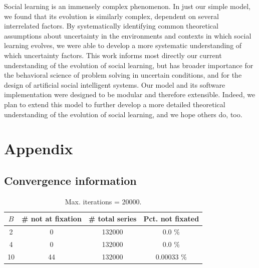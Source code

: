 \documentclass[letterpaper,11.5pt]{scrartcl}
\begin{document}
Social learning is an immensely complex phenomenon. In just our simple model, we
found that its evolution is similarly complex, dependent on several interrelated
factors. By systematically identifying common theoretical assumptions about
uncertainty in the environments and contexts in which social learning evolves,
we were able to develop a more systematic understanding of which uncertainty
factors. This work informs most directly our current understanding of the
evolution of social learning, but
has broader importance for the behavioral science of problem solving in uncertain
conditions, and for the design of artificial social intelligent systems.
Our model and its software implementation were designed to be modular and 
therefore extensible.  Indeed, we plan to extend this model to further develop 
a more detailed theoretical understanding of the evolution of social learning, 
and we hope others do, too.



% 


\appendix


\section{Appendix}

\subsection{Convergence information}

\begin{table}[h]
  \caption{Max. iterations = 20000.}
  \label{tab:convergence}
  \centering
  \begin{tabular}{cccc} \toprule
    $B$ & \# not at fixation & \# total series & Pct. not fixated \\
    \midrule  
    2  & 0  & 132000 & 0.0 \% \\
    4  & 0  & 132000 & 0.0 \% \\
    10 & 44 & 132000 & 0.00033  \% \\
    \bottomrule
  \end{tabular} 
\end{table}


\newpage
\end{document}
